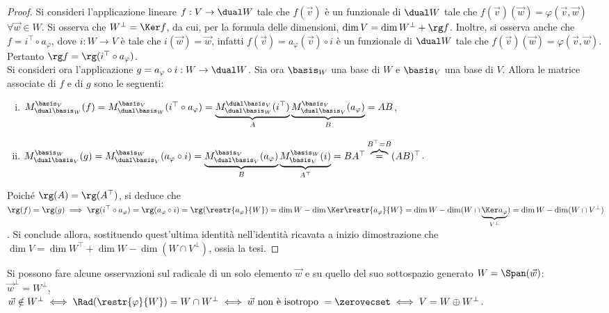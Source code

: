 \documentclass[11pt]{article}
\begin{document}
	\begin{proof}
		Si consideri l'applicazione lineare $f : V \to \dual W$ tale che $f(\vec v)$ è un funzionale di $\dual W$ tale che
		$f(\vec v)(\vec w) = \varphi(\vec v, \vec w)$ $\forall \vec w \in W$. Si osserva che $W^\perp = \Ker f$, da cui,
		per la formula delle dimensioni, $\dim V = \dim W^\perp + \rg f$. Inoltre, si osserva anche che
		$f = i^\top \circ a_\varphi$, dove $i : W \to V$ è tale che $i(\vec w) = \vec w$, infatti $f(\vec v) = a_\varphi(\vec v) \circ i$ è un funzionale di $\dual W$ tale che $f(\vec v)(\vec w) = \varphi(\vec v, \vec w)$. Pertanto
		$\rg f = \rg (i^\top \circ a_\varphi)$. \\
		
		Si consideri ora l'applicazione $g = a_\varphi \circ i : W \to \dual W$. Sia ora $\basis_W$ una base di $W$ e
		$\basis_V$ una base di $V$. Allora le matrice associate di $f$ e di $g$ sono le seguenti:
		
		\begin{enumerate}[(i)]
			\item $M_{\dual \basis_W}^{\basis_V}(f) = M_{\dual \basis_W}^{\basis_V}(i^\top \circ a_\varphi) =
			\underbrace{M_{\dual \basis_W}^{\dual \basis_V}(i^\top)}_A \underbrace{M_{\dual \basis_V}^{\basis_V}(a_\varphi)}_B = AB$,
			\item $M_{\dual \basis_V}^{\basis_W}(g) = M_{\dual \basis_V}^{\basis_W}(a_\varphi \circ i) =
			\underbrace{M_{\dual \basis_V}^{\basis_V}(a_\varphi)}_B \underbrace{M_{\basis_V}^{\basis_W}(i)}_{A^\top} = BA^\top \overbrace{=}^{B^\top = B} (AB)^\top$.
		\end{enumerate}
	
		Poiché $\rg(A) = \rg(A^\top)$, si deduce che $\rg(f) = \rg(g) \implies \rg(i^\top \circ a_\varphi) = \rg(a_\varphi \circ i) = \rg(\restr{a_\varphi}{W}) = \dim W - \dim \Ker \restr{a_\varphi}{W} = \dim W - \dim (W \cap \underbrace{\Ker a_\varphi}_{V^\perp}) = \dim W - \dim (W \cap V^\perp)$. Si conclude allora, sostituendo quest'ultima
		identità nell'identità ricavata a inizio dimostrazione che $\dim V = \dim W^\top + \dim W - \dim (W \cap V^\perp)$,
		ossia la tesi.
	\end{proof}

	\begin{remark}
		Si possono fare alcune osservazioni sul radicale di un solo elemento $\vec w$ e su quello del suo sottospazio
		generato $W = \Span(\vec w)$: \\
		
		\li $\vec w ^\perp = W^\perp$, \\
		\li $\vec w \notin W^\perp \iff \Rad (\restr{\varphi}{W}) = W \cap W^\perp \iff \vec w \text{ non è isotropo } = \zerovecset \iff
		V = W \oplus W^\perp$.
	\end{remark}
\end{document}
